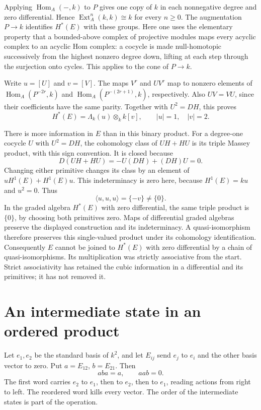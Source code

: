 Applying \(\operatorname{Hom}_A(-,k)\) to \(P\) gives one copy of
\(k\) in each nonnegative degree and zero differential. Hence
\(\operatorname{Ext}^n_A(k,k)\cong k\) for every \(n\ge0\).
The augmentation \(P\to k\) identifies \(H^*(E)\) with these
groups. Here one uses the elementary property that a bounded-above
complex of projective modules maps every acyclic complex to an
acyclic Hom complex: a cocycle is made null-homotopic successively
from the highest nonzero degree down, lifting at each step through
the surjection onto cycles. This applies to the cone of \(P\to k\).

Write \(u=[U]\) and \(v=[V]\). The maps \(V^r\) and \(UV^r\)
map to nonzero elements of
\(\operatorname{Hom}_A(P^{-2r},k)\) and
\(\operatorname{Hom}_A(P^{-(2r+1)},k)\), respectively.
Also \(UV=VU\), since their coefficients have the same parity.
Together with \(U^2=DH\), this proves
\[
 H^*(E)=\Lambda_k(u)\otimes_k k[v],\qquad |u|=1,\quad |v|=2.
\]

There is more information in \(E\) than in this binary product.
For a degree-one cocycle \(U\) with \(U^2=DH\), the cohomology
class of \(UH+HU\) is its triple Massey product, with this sign
convention. It is closed because
\[
 D(UH+HU)=-U(DH)+(DH)U=0.
\]
Changing either primitive changes its class by an element of
\(uH^1(E)+H^1(E)u\). This indeterminacy is zero here, because
\(H^1(E)=ku\) and \(u^2=0\). Thus
\begin{equation}\label{v4-prologue:eq:massey}
 \langle u,u,u\rangle=\{-v\}\ne\{0\}.
\end{equation}
In the graded algebra \(H^*(E)\) with zero differential, the same
triple product is \(\{0\}\), by choosing both primitives zero.
Maps of differential graded algebras preserve the displayed
construction and its indeterminacy. A quasi-isomorphism therefore
preserves this single-valued product under its cohomology
identification. Consequently \(E\) cannot be joined to
\(H^*(E)\) with zero differential by a chain of quasi-isomorphisms.
Its multiplication was strictly associative from the start.
Strict associativity has retained the cubic information in a
differential and its primitives; it has not removed it.

\section*{An intermediate state in an ordered product}
\label{v4-prologue:matrix}

Let \(e_1,e_2\) be the standard basis of \(k^2\), and let
\(E_{ij}\) send \(e_j\) to \(e_i\) and the other basis vector
to zero. Put \(a=E_{12}\), \(b=E_{21}\). Then
\begin{equation}\label{v4-prologue:eq:ordered-matrix}
 aba=a,\qquad aab=0.
\end{equation}
The first word carries \(e_2\) to \(e_1\), then to \(e_2\),
then to \(e_1\), reading actions from right to left. The reordered
word kills every vector. The order of the intermediate states is
part of the operation.

